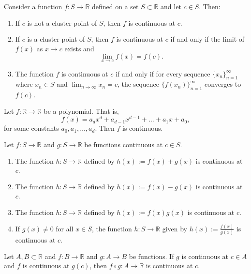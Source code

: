 \documentclass[../main.tex]{subfiles}
\begin{document}
    
    \begin{proposition}
        Consider a function $f : S \to \mathbb{R}$ defined on a set $S \subset \mathbb{R}$ and let $c \in S$. Then:
    \begin{enumerate}
        \item If $c$ is not a cluster point of $S$, then $f$ is continuous at $c$.
        \item If $c$ is a cluster point of $S$, then $f$ is continuous at $c$ if and only if the limit of $f(x)$ as $x \to c$ exists and
            \[
            \lim_{x\to c} f(x) = f(c).
            \]
        \item The function $f$ is continuous at $c$ if and only if for every sequence $\{x_n\}_{n=1}^{\infty}$ where $x_n \in S$ and $\lim_{n\to\infty} x_n = c$, the sequence $\{f(x_n)\}_{n=1}^{\infty}$ converges to $f(c)$.
    \end{enumerate}
    \end{proposition}
        
    \begin{proposition}
        Let $f : \mathbb{R} \to \mathbb{R}$ be a polynomial. That is,
        \[
        f(x) = a_d x^d + a_{d-1} x^{d-1} + \dots + a_1 x + a_0,
        \]
        for some constants $a_0, a_1, \dots, a_d$. Then $f$ is continuous.
    \end{proposition}
        
    \begin{proposition}
        Let $f : S \to \mathbb{R}$ and $g : S \to \mathbb{R}$ be functions continuous at $c \in S$.
    \begin{enumerate}
        \item The function $h: S \to \mathbb{R}$ defined by $h(x) := f(x) + g(x)$ is continuous at $c$.
        \item The function $h: S \to \mathbb{R}$ defined by $h(x) := f(x) - g(x)$ is continuous at $c$.
        \item The function $h: S \to \mathbb{R}$ defined by $h(x) := f(x)g(x)$ is continuous at $c$.
        \item If $g(x) \neq 0$ for all $x \in S$, the function $h: S \to \mathbb{R}$ given by $h(x) := \frac{f(x)}{g(x)}$ is continuous at $c$.
    \end{enumerate}
    \end{proposition}
        
    \begin{proposition}
        Let $A, B \subset \mathbb{R}$ and $f : B \to \mathbb{R}$ and $g : A \to B$ be functions. If $g$ is continuous at $c \in A$ and $f$ is continuous at $g(c)$, then $f \circ g: A \to \mathbb{R}$ is continuous at $c$.
    \end{proposition}
        
\end{document}

